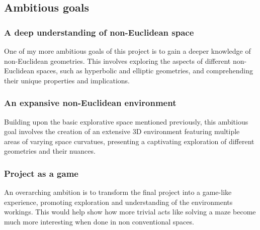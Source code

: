 \documentclass[]{article}
\begin{document}
        \subsection{Ambitious goals}
        \subsubsection{A deep understanding of non-Euclidean space}
            One of my more ambitious goals of this project is to gain a deeper knowledge of 
            non-Euclidean geometries. This involves exploring the aspects of different non-Euclidean spaces, such as hyperbolic and elliptic 
            geometries, and comprehending their unique properties and implications.
        \subsubsection{An expansive non-Euclidean environment}
            Building upon the basic explorative space mentioned previously, this ambitious goal involves the creation of an extensive 3D environment 
            featuring multiple areas of varying space curvatues, presenting a captivating exploration of different geometries and their nuances.
        \subsubsection{Project as a game}
            An overarching ambition is to transform the final project into a game-like experience, promoting exploration and understanding of the 
            environments workings. This would help show how more trivial acts like solving a maze become much more interesting when done in non 
            conventional spaces.


    \newpage
\end{document}

